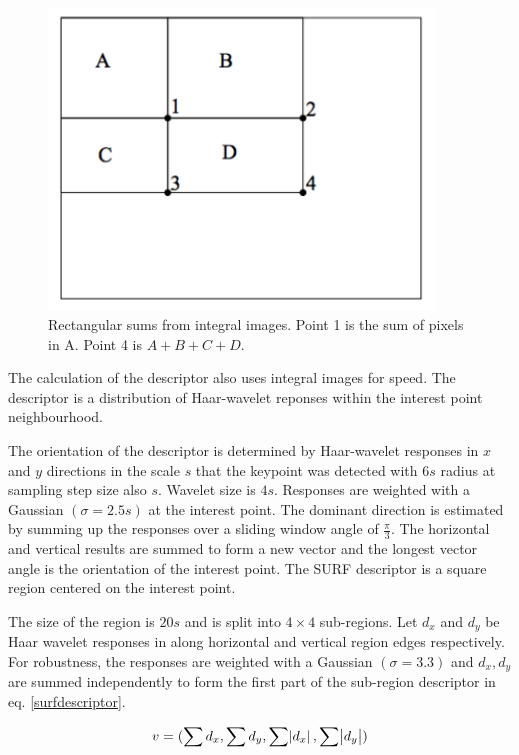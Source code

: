 \documentclass[english,12pt,a4paper,pdftex,elec,utf8]{aaltothesis}
\begin{document}
\begin{figure}[htb]
\begin{center}
\includegraphics[height=8cm]{figures/integralimage}
\end{center}
\caption{Rectangular sums from integral images. Point 1 is the sum of pixels in A. Point 4 is $A + B + C + D$.\cite{Viola2001}}
\label{integralimagefig}
\end{figure}

The calculation of the descriptor also uses integral images for speed. The descriptor is a distribution of Haar-wavelet reponses within the interest point neighbourhood. \cite{Bay2006}

The orientation of the descriptor is determined by Haar-wavelet responses in $x$ and $y$ directions in the scale $s$ that the keypoint was detected with $6s$ radius at sampling step size also $s$. Wavelet size is $4s$. Responses are weighted with a Gaussian $(\sigma = 2.5s)$ at the interest point. The dominant direction is estimated by summing up the responses over a sliding window angle of $\frac{\pi}{3}$. The horizontal and vertical results are summed to form a new vector and the longest vector angle is the orientation of the interest point. The SURF descriptor is a square region centered on the interest point. \cite{Bay2006}

The size of the region is $20s$ and is split into $4 \times 4$ sub-regions. Let $d_x$ and $d_y$ be Haar wavelet responses in along horizontal and vertical region edges respectively. For robustness, the responses are weighted with a Gaussian $(\sigma = 3.3)$ and $d_x, d_y$ are summed independently to form the first part of the sub-region descriptor in eq. \ref{surfdescriptor}. \cite{Bay2006}

\begin{equation}
  \label{surfdescriptor}
v = (\sum d_x, \sum d_y, \sum \abs{d_x}, \sum \abs{d_y})
  \end{equation}
\end{document}
